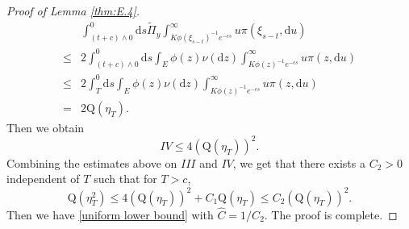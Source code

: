 \documentclass[12pt,a4paper]{amsart}
\numberwithin{equation}{section}
\theoremstyle{plain}
\theoremstyle{definition}
\theoremstyle{remark}
\begin{document}
\begin{proof}[Proof of Lemma \ref{thm:E.4}]
$$\begin{array}{rl}
&\displaystyle\int_{(t+c)\wedge 0}^0\mathrm ds\widetilde\Pi_y\int_{K\phi(\xi_{s-t})^{-1}e^{-\epsilon s}}^\infty u \pi(\xi_{s-t},\mathrm du)\\
\le&\displaystyle 2\int_{(t+c)\wedge 0}^0\mathrm ds\int_E\phi(z)\nu(\mathrm dz)\int_{K\phi(z)^{-1}e^{-\epsilon s}}^\infty u \pi(z, \mathrm du)\\
\le&\displaystyle 2\int_{T}^{0}\mathrm ds\int_E\phi(z)\nu(\mathrm dz)\int_{K\phi(z)^{-1}e^{-\epsilon s}}^\infty u \pi(z, \mathrm du)\\
=&\displaystyle 2\mathrm Q(\eta_T).
\end{array}
$$
Then we obtain
$$
IV\leq 4 (\mathrm Q(\eta_T))^2.
$$
Combining the estimates above on $III$ and $IV$, we get that there
exists a $C_2>0$ independent of $T$ such that for $T>c$,
$$
\mathrm Q(\eta_T^2)\le 4(\mathrm Q(\eta_T))^2+ C_1\mathrm Q(\eta_T)\le
C_2(\mathrm Q(\eta_T))^2.
$$
Then we have \eqref{uniform lower bound} with $\widehat C=1/C_2$.
The proof is complete. 
\end{proof}
\end{document}
